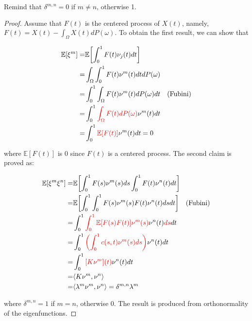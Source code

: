\documentclass[11pt,twoside,a4paper]{article}
\begin{document}
	Remind that $\delta^{m,n} = 0$ if $m \neq n$, otherwise 1.
	
	\begin{proof}
		Assume that $F(t)$ is the centered process of $X(t)$, namely, $F(t) = X(t) - \int_{\Omega}X(t)dP(\omega)$. To obtain the first result, we can show that
		
		\begin{equation}\label{Lemma1}
			\begin{split}
				\mathbb{E}[\xi^m] = & \mathbb{E} \biggl\lbrack \int_{0}^{1} F(t) \nu_{j}(t)dt\biggr\rbrack\\
				= & \int_{\Omega} \int_{0}^{1} F(t) \nu^m(t) dt dP(\omega)\\
				= & \int_{0}^{1} \int_{\Omega} F(t) \nu^m(t) dP(\omega) dt \quad \text{(Fubini)}\\
				= & \int_{0}^{1} {\color{red}\int_{\Omega} F(t) dP(\omega)} \nu^m(t) dt\\
				= & \int_{0}^{1} {\color{red}\mathbb{E}[F(t)]} \nu^m(t) dt = 0
			\end{split}
		\end{equation}
	
		where $\mathbb{E}[F(t)]$ is 0 since $F(t)$ is a centered process.
		The second claim is proved as:
		
		\begin{equation}\label{Lemma2}
			\begin{split}
				\mathbb{E} [\xi^m \xi^n] = & \mathbb{E}  \biggl\lbrack \int_{0}^{1} F(s) \nu^m(s)ds \int_{0}^{1} F(t) \nu^n(t)dt  \biggr\rbrack\\
				= & \mathbb{E} \biggl\lbrack {\int_{0}^{1} \int_{0}^{1} F(s) \nu^m(s) F(t) \nu^n(t) ds dt} \biggr\rbrack \quad \text{(Fubini)}\\
				= & \int_{0}^{1} {\color{red}\int_{0}^{1} \mathbb{E}[{F(s)F(t)}] \nu^m(s)} \nu^n(t) {\color{red}ds} dt\\
				= & \int_{0}^{1} {\color{red}\left(\int_{0}^{1}c(s,t)\nu^m(s)ds \right)} \nu^n(t) dt \\
				= & \int_{0}^{1}{\color{red}[K\nu^m](t)}\nu^n(t)dt\\
				= & \langle K \nu^m, \nu^n \rangle\\
				= & \langle \lambda^m \nu^m, \nu^n \rangle = \delta^{m,n}\lambda^{m}
			\end{split}
		\end{equation}
	
		where $\delta^{m,n} = 1$ if $m = n$, otherwise 0. The result is produced from orthonormality of the eigenfunctions.
		

\end{proof}
\end{document}
